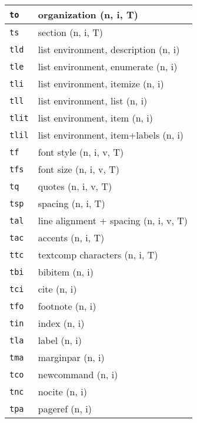 \documentclass[oneside,10pt,landscape,DIV16]{scrartcl}
\newcommand{\Map}[1] {\textbf{\textasciiacute}\texttt{#1}}
\begin{document}
\begin{multicols}{3}
\begin{center}
\begin{tabular}[]{|p{11mm}|p{60mm}|}
\hline \Map{to}   & organization                   \hfill (n, i, T)\\
\hline \Map{ts}   & section                        \hfill (n, i, T)\\
\hline \Map{tld}  & list environment, description  \hfill (n, i)\\
\hline \Map{tle}  & list environment, enumerate    \hfill (n, i)\\
\hline \Map{tli}  & list environment, itemize      \hfill (n, i)\\
\hline \Map{tll}  & list environment, list         \hfill (n, i)\\
\hline \Map{tlit} & list environment, item         \hfill (n, i)\\
\hline \Map{tlil} & list environment, item+labels  \hfill (n, i)\\
\hline \Map{tf}   & font style                     \hfill (n, i, v, T)\\
\hline \Map{tfs}  & font size                      \hfill (n, i, v, T)\\
\hline \Map{tq}   & quotes                         \hfill (n, i, v, T)\\
\hline \Map{tsp}  & spacing                        \hfill (n, i, T)\\
\hline \Map{tal}  & line alignment + spacing       \hfill (n, i, v, T)\\
\hline \Map{tac}  & accents                        \hfill (n, i, T)\\
\hline \Map{ttc}  & textcomp characters            \hfill (n, i, T)\\
\hline
\hline \Map{tbi}  & bibitem                        \hfill (n, i)\\
\hline \Map{tci}  & cite                           \hfill (n, i)\\
\hline \Map{tfo}  & footnote                       \hfill (n, i)\\
\hline \Map{tin}  & index                          \hfill (n, i)\\
\hline \Map{tla}  & label                          \hfill (n, i)\\
\hline \Map{tma}  & marginpar                      \hfill (n, i)\\
\hline \Map{tco}  & newcommand                     \hfill (n, i)\\
\hline \Map{tnc}  & nocite                         \hfill (n, i)\\
\hline \Map{tpa}  & pageref                        \hfill (n, i)\\

\end{tabular}
\end{center}
\end{multicols}
\end{document}
